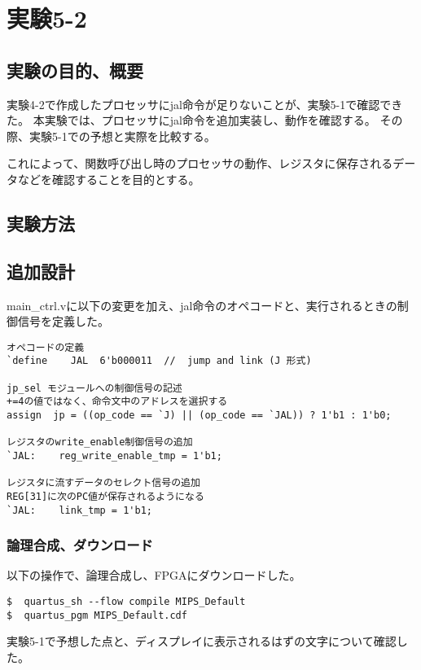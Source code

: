 \section{実験5-2}
\subsection{実験の目的、概要}
実験4-2で作成したプロセッサにjal命令が足りないことが、実験5-1で確認できた。
本実験では、プロセッサにjal命令を追加実装し、動作を確認する。
その際、実験5-1での予想と実際を比較する。

これによって、関数呼び出し時のプロセッサの動作、レジスタに保存されるデータなどを確認することを目的とする。

\subsection{実験方法}
\subsection{追加設計}
main\_ctrl.vに以下の変更を加え、jal命令のオペコードと、実行されるときの制御信号を定義した。
\begin{lstlisting}[caption={main\_ctrl.vの追加設計},label={mainctrl.vの追加設計5-2}]
オペコードの定義
`define    JAL  6'b000011  //  jump and link (J 形式)

jp_sel モジュールへの制御信号の記述
+=4の値ではなく、命令文中のアドレスを選択する
assign  jp = ((op_code == `J) || (op_code == `JAL)) ? 1'b1 : 1'b0;

レジスタのwrite_enable制御信号の追加
`JAL:    reg_write_enable_tmp = 1'b1;

レジスタに流すデータのセレクト信号の追加
REG[31]に次のPC値が保存されるようになる
`JAL:    link_tmp = 1'b1;
\end{lstlisting}

\subsubsection{論理合成、ダウンロード}
以下の操作で、論理合成し、FPGAにダウンロードした。
\begin{lstlisting}[caption={論理合成、ダウンロード},label={論理合成、ダウンロード5-2}]
$  quartus_sh --flow compile MIPS_Default
$  quartus_pgm MIPS_Default.cdf
\end{lstlisting}

実験5-1で予想した点と、ディスプレイに表示されるはずの文字について確認した。

